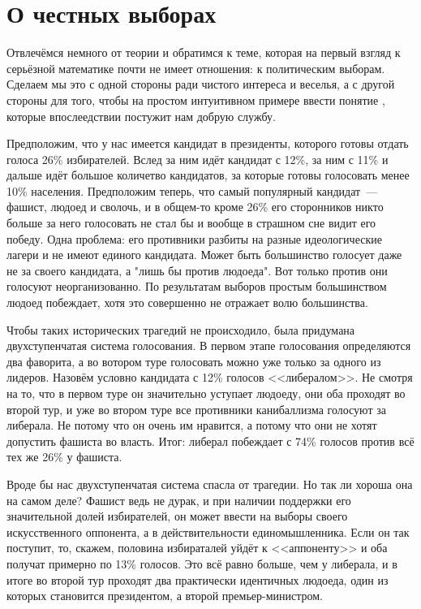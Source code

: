 \section{О честных выборах}

Отвлечёмся немного от теории и обратимся к теме, которая на первый взгляд к серьёзной математике почти не имеет отношения: к политическим выборам. Сделаем мы это с одной стороны ради чистого интереса и веселья, а с другой стороны для того, чтобы на простом интуитивном примере ввести понятие , которые впослеедствии постужит нам добрую службу.

Предположим, что у нас имеется кандидат в президенты, которого готовы отдать голоса 26\% избирателей. Вслед за ним идёт кандидат с 12\%, за ним с 11\% и дальше идёт большое количетво кандидатов, за которые готовы голосовать менее 10\% населения. Предположим теперь, что самый популярный кандидат~--- фашист, людоед и сволочь, и в общем-то кроме 26\% его сторонников никто больше за него голосовать не стал бы и вообще в страшном сне видит его победу. Одна проблема: его противники разбиты на разные идеологические лагери и не имеют единого кандидата. Может быть большинство голосует даже не за своего кандидата, а "лишь бы против людоеда". Вот только против они голосуют неорганизованно. По результатам выборов простым большинством людоед побеждает, хотя это совершенно не отражает волю большинства.

Чтобы таких исторических трагедий не происходило, была придумана двухступенчатая система голосования. В первом этапе голосования определяются два фаворита, а во вотором туре голосовать можно уже только за одного из лидеров. Назовём условно кандидата с 12\% голосов <<либералом>>. Не смотря на то, что в первом туре он значительно уступает людоеду, они оба проходят во второй тур, и уже во втором туре все противники канибаллизма голосуют за либерала. Не потому что он очень им нравится, а потому что они не хотят допустить фашиста во власть. Итог: либерал побеждает с 74\% голосов против всё тех же 26\% у фашиста.

Вроде бы нас двухступенчатая система спасла от трагедии. Но так ли хороша она на самом деле? Фашист ведь не дурак, и при наличии поддержки его значительной долей избирателей, он может ввести на выборы своего искусственного оппонента, а в действительности единомышленника. Если он так поступит, то, скажем, половина избираталей уйдёт к <<аппоненту>> и оба получат примерно по 13\% голосов. Это всё равно больше, чем у либерала, и в итоге во второй тур проходят два практически идентичных людоеда, один из которых становится президентом, а второй премьер-министром.

